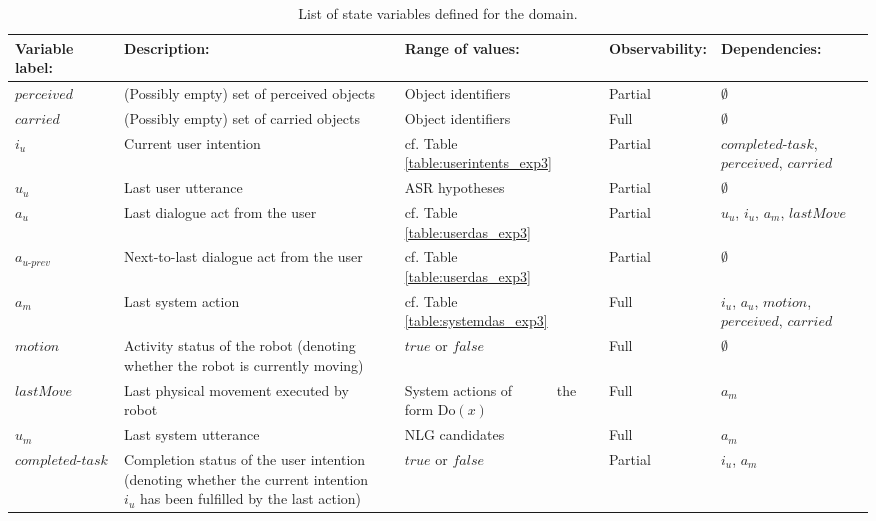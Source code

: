 \renewcommand{\arraystretch}{1.9}
\setlength{\tabcolsep}{8pt}
\begin{table}
\begin{center}
\begin{tabular}{|p{35mm}||p{7cm}p{5mm}|p{34mm}p{5mm}|p{27mm}|p{4cm}|} \hline
\textbf{Variable label:} & \textbf{Description:}  && \textbf{Range of values:} && \textbf{Observability: } & \textbf{Dependencies: }\\ \hline\hline
$\mathit{perceived}$ & (Possibly empty) set of perceived objects && Object identifiers && Partial& $\emptyset$ \\\hline
$\mathit{carried}$ & (Possibly empty) set of carried objects && Object identifiers && Full  & $\emptyset$ \\\hline
$i_u$ & Current user intention && cf. Table \ref{table:userintents_exp3} && Partial  & $\mathit{completed\mbox{-}task}$, $\mathit{perceived}$, $\mathit{carried}$ \\\hline
$u_u$ & Last user utterance && ASR hypotheses && Partial & $\emptyset$ \\ \hline
$a_u$ & Last dialogue act from the user && cf. Table \ref{table:userdas_exp3} && Partial & $u_u$, $i_u$, $a_m$, $\mathit{lastMove}$ \\\hline
$a_{u\mbox{-}prev}$ & Next-to-last dialogue act from the user && cf. Table \ref{table:userdas_exp3} && Partial & $\emptyset$ \\\hline
$a_m$ & Last system action && cf. Table \ref{table:systemdas_exp3} && Full & $i_u$, $a_u$, $\mathit{motion}$, \ \ \ \ \  $\phantom{a}$ $\mathit{perceived}$, $\mathit{carried}$ \\ \hline
$\mathit{motion}$ & Activity status of the robot (denoting whether the robot is currently moving) && $\mathit{true}$ or $\mathit{false}$ && Full  & $\emptyset$  \\\hline
$\mathit{lastMove}$ & Last physical movement executed by robot && System actions of \ \ \ \ $\phantom{a}$ the form $\mathrm{Do}(x)$ && Full & $a_m$ \\\hline
$u_m$ & Last system utterance && NLG candidates && Full & $a_m$ \\ \hline
$\mathit{completed\mbox{-}task}$ & Completion status of the user intention (denoting whether the current intention $i_u$ has been fulfilled by the last action) \vspace{2mm} && $\mathit{true}$ or $\mathit{false}$ && Partial & $i_u$, $a_m$ \\ \hline
\end{tabular}
\end{center}
\caption{List of state variables defined for the domain.}
\label{table:statevariables}
\end{table}

